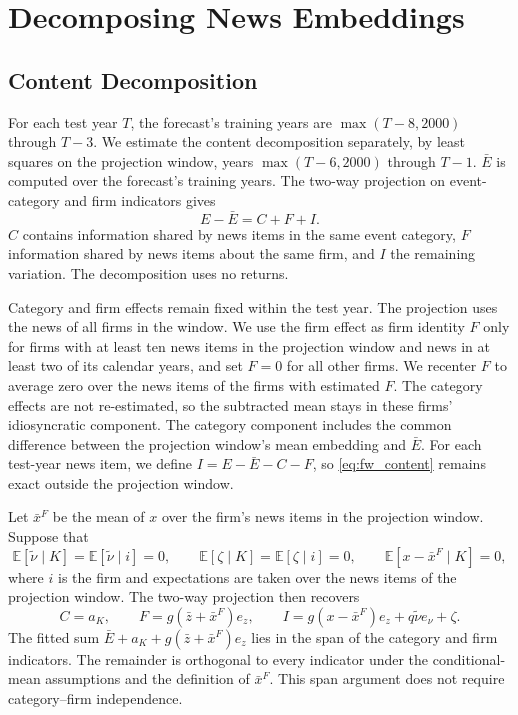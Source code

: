 \documentclass[11pt,letterpaper]{article}
\let\oldsubsection\subsection
\renewcommand{\subsection}{\FloatBarrier\oldsubsection}
\theoremstyle{remark}
\begin{document}
\section{Decomposing News Embeddings}
\label{sec:decomp}

\subsection{Content Decomposition}

For each test year $T$, the forecast's training years are $\max(T-8,2000)$ through $T-3$. We estimate the content decomposition separately, by least squares on the projection window, years $\max(T-6,2000)$ through $T-1$. $\bar E$ is computed over the forecast's training years. The two-way projection on event-category and firm indicators gives
\begin{equation}\label{eq:fw_content}
E-\bar E=C+F+I.
\end{equation}
$C$ contains information shared by news items in the same event category, $F$ information shared by news items about the same firm, and $I$ the remaining variation. The decomposition uses no returns.

Category and firm effects remain fixed within the test year. The projection uses the news of all firms in the window. We use the firm effect as firm identity $F$ only for firms with at least ten news items in the projection window and news in at least two of its calendar years, and set $F=0$ for all other firms. We recenter $F$ to average zero over the news items of the firms with estimated $F$. The category effects are not re-estimated, so the subtracted mean stays in these firms' idiosyncratic component. The category component includes the common difference between the projection window's mean embedding and $\bar E$. For each test-year news item, we define $I=E-\bar E-C-F$, so \eqref{eq:fw_content} remains exact outside the projection window.

Let $\bar x^F$ be the mean of $x$ over the firm's news items in the projection window. Suppose that
\[
\mathbb E[\tilde\nu\mid K]=\mathbb E[\tilde\nu\mid i]=0,
\qquad
\mathbb E[\zeta\mid K]=\mathbb E[\zeta\mid i]=0,
\qquad
\mathbb E[x-\bar x^F\mid K]=0,
\]
where $i$ is the firm and expectations are taken over the news items of the projection window. The two-way projection then recovers
\begin{equation}\label{eq:fw_content_components}
C=a_K,
\qquad
F=g\left(\bar z+\bar x^F\right)e_z,
\qquad
I=g\left(x-\bar x^F\right)e_z+q\tilde\nu e_\nu+\zeta.
\end{equation}
The fitted sum $\bar E+a_K+g(\bar z+\bar x^F)e_z$ lies in the span of the category and firm indicators. The remainder is orthogonal to every indicator under the conditional-mean assumptions and the definition of $\bar x^F$. This span argument does not require category--firm independence.
\end{document}
